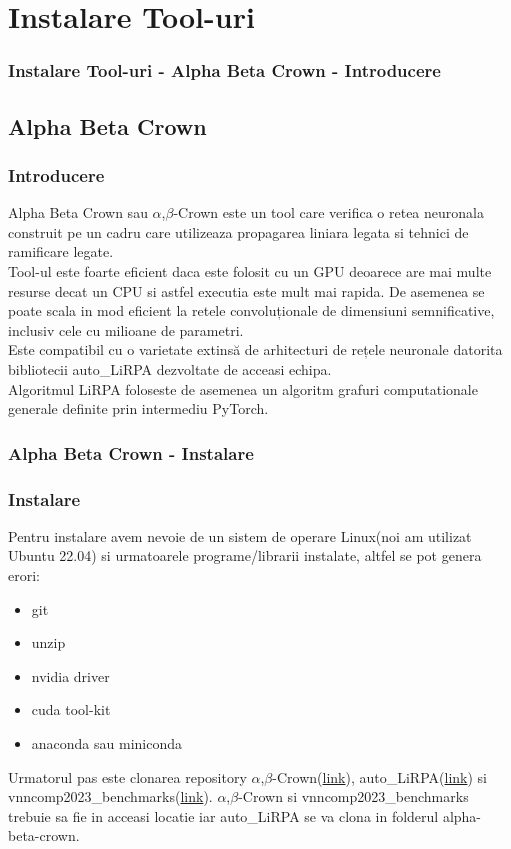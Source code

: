 \documentclass{beamer}
\newcommand\tab[1][1cm]{\hspace*{#1}}
\begin{document}

\section{Instalare Tool-uri}
\begin{frame}
\frametitle{Instalare Tool-uri - Alpha Beta Crown - Introducere}

\subsection{Alpha Beta Crown}
\subsubsection{Introducere}
\tab Alpha Beta Crown sau $\alpha$,$\beta$-Crown este un tool care verifica o retea neuronala construit pe un cadru care utilizeaza propagarea liniara legata si tehnici de ramificare legate. \\
\tab Tool-ul este foarte eficient daca este folosit cu un GPU deoarece are mai multe resurse decat un CPU si astfel executia este mult mai rapida. De asemenea se poate scala in mod eficient la retele convoluționale de dimensiuni semnificative, inclusiv cele cu milioane de parametri. \\
\tab Este compatibil cu o varietate extinsă de arhitecturi de rețele neuronale datorita bibliotecii auto\_LiRPA dezvoltate de acceasi echipa. \\
\tab Algoritmul LiRPA foloseste de asemenea un algoritm grafuri computationale generale definite prin intermediu PyTorch.

\end{frame}
\begin{frame}
\frametitle{Alpha Beta Crown - Instalare}

\subsubsection{Instalare}
\tab Pentru instalare avem nevoie de un sistem de operare Linux(noi am utilizat Ubuntu 22.04) si urmatoarele programe/librarii instalate, altfel se pot genera erori:
\begin{itemize}
  \item git
  \item unzip
  \item nvidia driver
  \item cuda tool-kit
  \item anaconda sau miniconda
\end{itemize}
\tab Urmatorul pas este clonarea repository $\alpha$,$\beta$-Crown(\href{https://github.com/Verified-Intelligence/alpha-beta-CROWN}{link}), auto\_LiRPA(\href{https://github.com/Verified-Intelligence/auto_LiRPA}{link}) si vnncomp2023\_benchmarks(\href{https://github.com/ChristopherBrix/vnncomp2023_benchmarks}{link}). $\alpha$,$\beta$-Crown si vnncomp2023\_benchmarks trebuie sa fie in acceasi locatie iar auto\_LiRPA se va clona in folderul alpha-beta-crown.
\end{frame}
\end{document}
